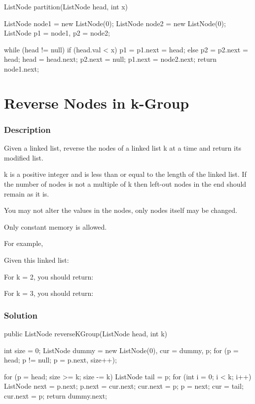 \begin{Code}
ListNode partition(ListNode head, int x) {
    ListNode node1 = new ListNode(0);
    ListNode node2 = new ListNode(0);
    ListNode p1 = node1, p2 = node2;

    while (head != null) {
        if (head.val < x)
            p1 = p1.next = head;
        else
            p2 = p2.next = head;
        head = head.next;
    }
    p2.next = null;
    p1.next = node2.next;
    return node1.next;
}
\end{Code}

\newpage

\section{Reverse Nodes in k-Group} %

\subsubsection{Description}
Given a linked list, reverse the nodes of a linked list k at a time and return its modified list.

k is a positive integer and is less than or equal to the length of the linked list. If the number of nodes is not a multiple of k then left-out nodes in the end should remain as it is.

You may not alter the values in the nodes, only nodes itself may be changed.

Only constant memory is allowed.

For example,

Given this linked list: 

For k = 2, you should return: 

For k = 3, you should return: 

\subsubsection{Solution}

\begin{Code}
public ListNode reverseKGroup(ListNode head, int k) {
    int size = 0;
    ListNode dummy = new ListNode(0), cur = dummy, p;
    for (p = head; p != null; p = p.next, size++);

    for (p = head; size >= k; size -= k) {
        ListNode tail = p;
        for (int i = 0; i < k; i++) {
            ListNode next = p.next;
            p.next = cur.next;
            cur.next = p;
            p = next;
        }
        cur = tail;
    }
    cur.next = p;
    return dummy.next;
}
\end{Code}

